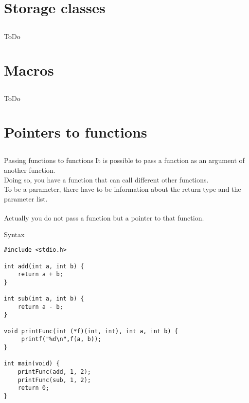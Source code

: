 \section{Storage classes}
\subsection{}

\begin{frame}{ToDo}

\end{frame}

\section{Macros}
\subsection{}

\begin{frame}{ToDo}

\end{frame}

\section{Pointers to functions}
\subsection{}

\begin{frame}{Passing functions to functions}
	It is possible to pass a function as an argument of another function.\\
	Doing so, you have a function that can call different other functions.\\
	To be a parameter, there have to be information about the return type and the parameter list.\\
	\ \\
	Actually you do not pass a function but a pointer to that function.
\end{frame}

\begin{frame}[fragile]{Syntax}
	\begin{lstlisting}
#include <stdio.h>

int add(int a, int b) {
	return a + b;
}

int sub(int a, int b) {
	return a - b;
}

void printFunc(int (*f)(int, int), int a, int b) {
	 printf("%d\n",f(a, b));
}

int main(void) {
	printFunc(add, 1, 2);
	printFunc(sub, 1, 2);
	return 0;
}
\end{lstlisting}

\end{frame}

